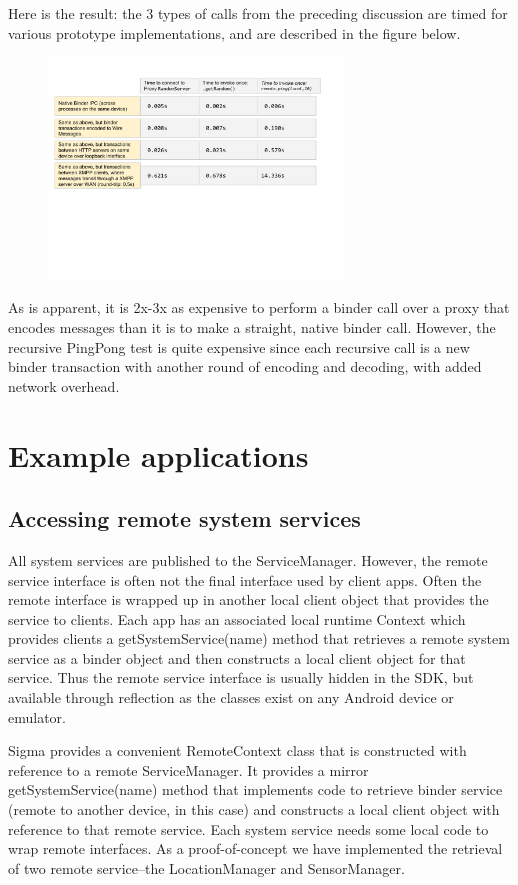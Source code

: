 \documentclass[prodmode]{acmlarge}
\begin{document}
Here is the result: the 3 types of calls from the preceding discussion are timed for various prototype implementations, and are described in the figure below.

\begin{figure}
\centering
\includegraphics[width=0.7\textwidth]{drawings/Performance.pdf}
\end{figure}

As is apparent, it is 2x-3x as expensive to perform a binder call over a proxy that encodes messages than it is to make a straight, native binder call. However, the recursive PingPong test is quite expensive since each recursive call is a new binder transaction with another round of encoding and decoding, with added network overhead.

\section{Example applications}

\subsection{Accessing remote system services}
All system services are published to the ServiceManager. However, the remote service interface is often not the final interface used by client apps. Often the remote interface is wrapped up in another local client object that provides the service to clients. Each app has an associated local runtime Context which provides clients a getSystemService(name) method that retrieves a remote system service as a binder object and then constructs a local client object for that service. Thus the remote service interface is usually hidden in the SDK, but available through reflection as the classes exist on any Android device or emulator.

Sigma provides a convenient RemoteContext class that is constructed with reference to a remote ServiceManager. It provides a mirror getSystemService(name) method that implements code to retrieve binder service (remote to another device, in this case) and constructs a local client object with reference to that remote service. Each system service needs some local code to wrap remote interfaces. As a proof-of-concept we have implemented the retrieval of two remote service--the LocationManager and SensorManager.
\end{document}
